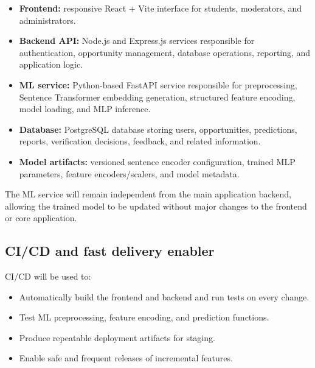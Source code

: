 \documentclass[11pt,a4paper]{article}
\begin{document}
\begin{itemize}[leftmargin=0.7cm]

    \item \textbf{Frontend:} responsive React + Vite interface for students,
    moderators, and administrators.

    \item \textbf{Backend API:} Node.js and Express.js services responsible
    for authentication, opportunity management, database operations,
    reporting, and application logic.

    \item \textbf{ML service:} Python-based FastAPI service responsible for
    preprocessing, Sentence Transformer embedding generation, structured
    feature encoding, model loading, and MLP inference.

    \item \textbf{Database:} PostgreSQL database storing users, opportunities,
    predictions, reports, verification decisions, feedback, and related
    information.

    \item \textbf{Model artifacts:} versioned sentence encoder configuration,
    trained MLP parameters, feature encoders/scalers, and model metadata.
\end{itemize}

The ML service will remain independent from the main application backend,
allowing the trained model to be updated without major changes to the
frontend or core application.

\subsection{CI/CD and fast delivery enabler}

CI/CD will be used to:

\begin{itemize}[leftmargin=0.7cm]

    \item Automatically build the frontend and backend and run tests on
    every change.

    \item Test ML preprocessing, feature encoding, and prediction functions.

    \item Produce repeatable deployment artifacts for staging.

    \item Enable safe and frequent releases of incremental features.
\end{itemize}
\end{document}
